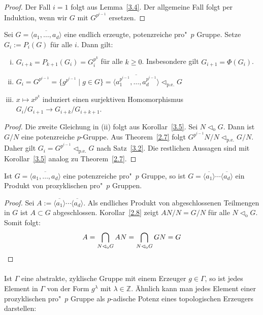 \documentclass[11pt,a4paper,openany]{memoir}
\begin{document}
\begin{proof}
Der Fall $i=1$ folgt aus Lemma~\ref{3.4}. Der allgemeine Fall folgt per Induktion, wenn wir $G$ mit $G^{p^{i-1}}$ ersetzen.
\end{proof}

\begin{theorem}\label{3.6}
Sei $G=\overline{\langle a_1,\ldots,a_d\rangle}$ eine endlich erzeugte, potenzreiche pro"~$p$ Gruppe. Setze $G_i:=P_i(G)$ für alle $i$. Dann gilt:
\begin{enumerate}[(i)]
\item $G_{i+k}=P_{k+1}(G_i)=G_i^{p^k}$ für alle $k\geq 0$. Insbesondere gilt $G_{i+1}=\Phi(G_i)$.
\item $G_i=G^{p^{i-1}}=\{g^{p^{i-1}}\mid g\in G\}=\overline{\langle a_1^{p^{i-1}},\ldots,a_d^{p^{i-1}}\rangle}\lhd_\text{p.e.}G$
\item $x\mapsto x^{p^k}$ induziert einen surjektiven Homomorphismus $G_i/G_{i+1}\to G_{i+k}/G_{i+k+1}$.
\end{enumerate}
\end{theorem}

\begin{proof}
Die zweite Gleichung in (ii) folgt aus Korollar~\ref{3.5}. Sei $N\lhd_\text{o}G$. Dann ist $G/N$ eine potenzreiche $p$-Gruppe. Aus Theorem~\ref{2.7} folgt $G^{p^{i-1}}N/N\lhd_\text{p.e.}G/N$. Daher gilt $G_i=G^{p^{i-1}} \lhd_\text{p.e.}G$ nach Satz~\ref{3.2}. Die restlichen Aussagen sind mit Korollar~\ref{3.5} analog zu Theorem~\ref{2.7}.
\end{proof}

\begin{proposition}\label{3.7}
Ist $G=\overline{\langle a_1,\ldots,a_d\rangle}$ eine potenzreiche pro"~$p$ Gruppe, so ist $G=\overline{\langle a_1\rangle}\cdots\overline{\langle a_d\rangle}$ ein Produkt von prozyklischen pro"~$p$ Gruppen.
\end{proposition}

\begin{proof}
Sei $A:=\overline{\langle a_1\rangle}\cdots\overline{\langle a_d\rangle}$. Als endliches Produkt von abgeschlossenen Teilmengen in $G$ ist $A\subset G$ abgeschlossen. Korollar~\ref{2.8} zeigt $AN/N=G/N$ für alle $N\lhd_\text{o}G$. Somit folgt:
\[A=\bigcap_{N\lhd_\text{o}G}AN =\bigcap_{N\lhd_\text{o}G}GN=G\qedhere\]
\end{proof}

\iffalse
\paragraph{} Ist $\Gamma$ eine abstrakte, zyklische Gruppe mit einem Erzeuger $g\in\Gamma$, so ist jedes Element in $\Gamma$ von der Form $g^\lambda$ mit $\lambda\in\mathbb{Z}$. Ähnlich kann man jedes Element einer prozyklischen pro"~$p$ Gruppe als $p$-adische Potenz eines topologischen Erzeugers darstellen:
\end{document}
